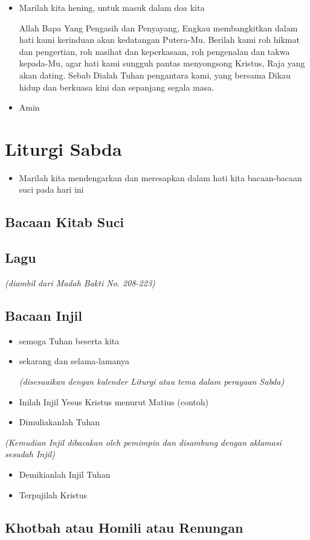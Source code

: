 \documentclass[a4paper,12pt]{article}
\newcommand{\BU}[1]{\begin{itemize} \item[U:] #1 \end{itemize}}
\newcommand{\BP}[1]{\begin{itemize} \item[P:] #1 \end{itemize}}
\begin{document}
\BP{Marilah kita hening, untuk masuk dalam doa kita

Allah Bapa Yang Pengasih dan Penyayang, Engkau membangkitkan dalam hati kami kerinduan akan kedatangan Putera-Mu.
Berilah kami roh hikmat dan pengertian, roh nasihat dan keperkasaan, roh pengenalan dan takwa kepada-Mu, agar hati kami
sungguh pantas menyongsong Kristus, Raja yang akan dating. Sebab Dialah Tuhan pengantara kami, yang bersama Dikau hidup
dan berkuasa kini dan sepanjang segala masa.}

\BU{Amin}

\section{Liturgi Sabda}

\BP{Marilah kita mendengarkan dan meresapkan dalam hati kita bacaan-bacaan suci pada hari ini}

\subsection*{Bacaan Kitab Suci}

\subsection*{Lagu}

\textit{(diambil dari Madah Bakti No. 208-223)}

\subsection*{Bacaan Injil}

\BP{semoga Tuhan beserta kita}

\BU{sekarang dan selama-lamanya

\textit{(disesuaikan dengan kalender Liturgi atau tema dalam perayaan Sabda)}
}

\BP{Inilah Injil Yesus Kristus menurut Matius (contoh)}

\BU{Dimuliakanlah Tuhan}

\textit{(Kemudian Injil dibacakan oleh pemimpin dan disambung dengan aklamasi sesudah Injil)
}
\BP{Demikianlah Injil Tuhan}

\BU{Terpujilah Kristus}

\subsection*{Khotbah atau Homili atau Renungan}
\end{document}
